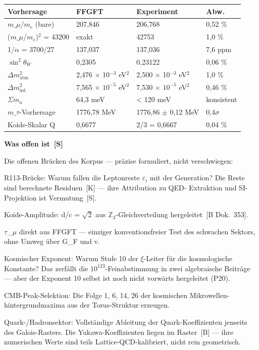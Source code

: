 \documentclass[11pt,oneside]{book}
\newcommand{\status}[1]{\penalty10000\,{\scriptsize\textcolor{gray!60}{[#1]}}}
\begin{document}
\begin{center}
\small
\begin{tabular}{p{2.5cm}p{1.8cm}p{2cm}l}
\toprule
Vorhersage & FFGFT & Experiment & Abw. \\
\midrule
$m\_\mu$/$m_e$ (bare) & 207,846 & 206,768 & 0,52 \% \\
($m\_\mu$/$m_e$)$^2$ = 43200 & exakt & 42753 & 1,0 \% \\
1/$\alpha$ = 3700/27 & 137,037 & 137,036 & 7,6 ppm \\
$\sin^2\theta_W$ & 0,2305 & 0,23122 & 0,06 \% \\
$\Delta m^2_\text{atm}$ & 2,476 $\times$ 10$^{-3}$ eV$^2$ & 2,500 $\times$ 10$^{-3}$ eV$^2$ & 1,0 \% \\
$\Delta m^2_\text{sol}$ & 7,565 $\times$ $10^{-5}$ eV$^2$ & 7,530 $\times$ $10^{-5}$ eV$^2$ & 0,46 \% \\
$\Sigma m_
u$ & 64,3 meV & < 120 meV & konsistent \\
$m\_\tau$-Vorhersage & 1776,78 MeV & 1776,86 $\pm$ 0,12 MeV & 0,4$\sigma$ \\
Koide-Skalar Q & 0,6677 & 2/3 = 0,6667 & 0,04 \% \\
\bottomrule
\end{tabular}
\end{center}

\textbf{Was offen ist \status{S}}


Die offenen Brücken des Korpus — präzise formuliert, nicht verschwiegen:


R113-Brücke: Warum fallen die Leptonreste $\varepsilon_i$ mit der Generation?
Die Reste sind berechnete Residuen \status{K} — ihre Attribution zu QED-
Extraktion und SI-Projektion ist Vermutung \status{S}.


Koide-Amplitude: d/c = $\sqrt{2}$ aus $\mathbb{Z}_3$-Gleichverteilung hergeleitet \status{B Dok.~353}.


$\tau$\_$\mu$ direkt aus FFGFT — einziger konventionsfreier Test des schwachen
Sektors, ohne Umweg über G\_F und v.


Kosmischer Exponent: Warum Stufe 10 der $\xi$-Leiter für die kosmologische
Konstante? Das zerfällt die $10^{123}$-Feinabstimmung in zwei algebraische
Beiträge — aber der Exponent 10 selbst ist noch nicht vorwärts hergeleitet
(P20).


CMB-Peak-Selektion: Die Folge {1, 6, 14, 26} der kosmischen Mikrowellen-
hintergrundmaxima aus der Torus-Struktur erzeugen.


Quark-/Hadronsektor: Vollständige Ableitung der Quark-Koeffizienten
jenseits des Galois-Rasters. Die Yukawa-Koeffizienten liegen im Raster
\status{B} — ihre numerischen Werte sind teils Lattice-QCD-kalibriert, nicht
rein geometrisch.
\end{document}
